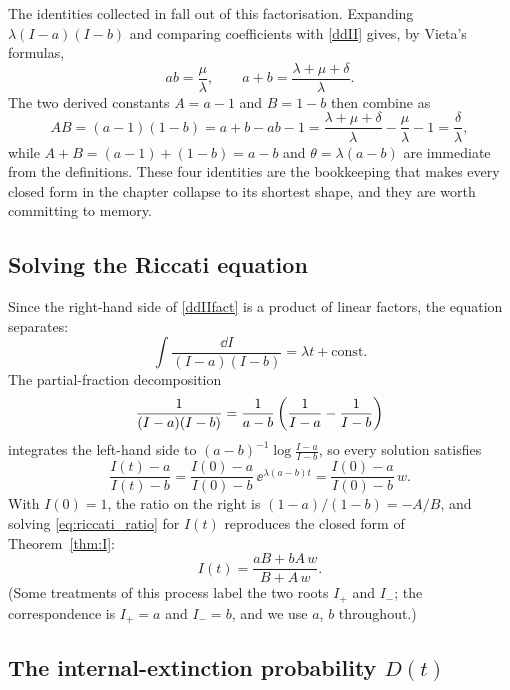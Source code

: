 The identities collected in  fall out of this
factorisation. Expanding $\lambda(I-a)(I-b)$ and comparing coefficients with
\eqref{ddII} gives, by Vieta's formulas,
$$ab=\frac{\mu}{\lambda},\qquad a+b=\frac{\lambda+\mu+\delta}{\lambda}.$$
The two derived constants $A=a-1$ and $B=1-b$ then combine as
$$AB = (a-1)(1-b) = a + b - ab - 1
= \frac{\lambda+\mu+\delta}{\lambda} - \frac{\mu}{\lambda} - 1
= \frac{\delta}{\lambda},$$
while $A+B=(a-1)+(1-b)=a-b$ and $\theta=\lambda(a-b)$ are immediate from the
definitions. These four identities are the bookkeeping that makes every closed
form in the chapter collapse to its shortest shape, and they are worth
committing to memory.

\subsection{Solving the Riccati equation}

Since the right-hand side of \eqref{ddIIfact} is a product of linear factors,
the equation separates:
$$\int \frac{\dd I}{(I-a)(I-b)} = \lambda t + \text{const}.$$
The partial-fraction decomposition
$$\frac{1}{(I-a)(I-b)} = \frac{1}{a-b}\left(\frac{1}{I-a}-\frac{1}{I-b}\right)$$
integrates the left-hand side to $(a-b)^{-1}\log\frac{I-a}{I-b}$, so every
solution satisfies
\begin{equation}
\label{eq:riccati_ratio}
\frac{I(t)-a}{I(t)-b} = \frac{I(0)-a}{I(0)-b}\,\ee^{\lambda(a-b)t} = \frac{I(0)-a}{I(0)-b}\,w.
\end{equation}
With $I(0)=1$, the ratio on the right is $(1-a)/(1-b)=-A/B$, and solving
\eqref{eq:riccati_ratio} for $I(t)$ reproduces the closed form of
Theorem~\ref{thm:I}:
\begin{equation}
\label{formI}
I(t) = \frac{aB + bA\,w}{B + A\,w}.
\end{equation}
(Some treatments of this process label the two roots $I_+$ and $I_-$; the
correspondence is $I_+=a$ and $I_-=b$, and we use $a$, $b$ throughout.)

\subsection{The internal-extinction probability $D(t)$}

